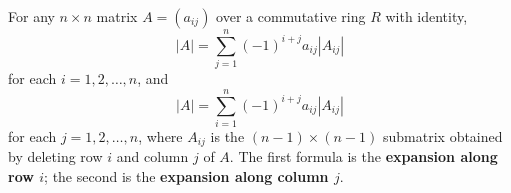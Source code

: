 For any $n \times n$ matrix $A = (a_{ij})$ over a commutative ring $R$ with identity,
\[
|A| = \sum_{j=1}^{n} (-1)^{i+j} a_{ij} |A_{ij}|
\]
for each $i = 1, 2, \ldots, n$, and
\[
|A| = \sum_{i=1}^{n} (-1)^{i+j} a_{ij} |A_{ij}|
\]
for each $j = 1, 2, \ldots, n$, where $A_{ij}$ is the $(n-1) \times (n-1)$ submatrix obtained by deleting row $i$ and column $j$ of $A$.
The first formula is the \textbf{expansion along row $i$}; the second is the \textbf{expansion along column $j$}.
